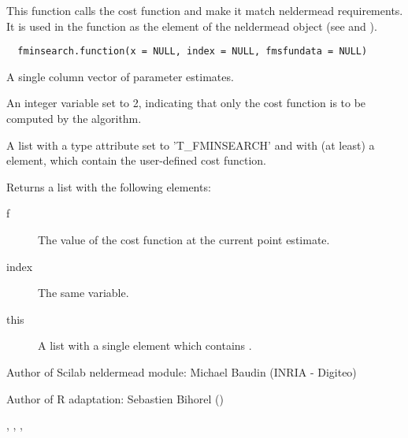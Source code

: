 %
\begin{Description}\relax
This function calls the cost function and make it match neldermead
requirements. It is used in the  function as the
 element of the neldermead object (see 
and ). 
\end{Description}
%
\begin{Usage}
\begin{verbatim}
  fminsearch.function(x = NULL, index = NULL, fmsfundata = NULL)
\end{verbatim}
\end{Usage}
%
\begin{Arguments}
\begin{ldescription}
\item[\code{x}] A single column vector of parameter estimates.
\item[\code{index}] An integer variable set to 2, indicating that only the cost
function is to be computed by the algorithm.
\item[\code{fmsfundata}] A list with a type attribute set to 'T\_FMINSEARCH' and
with (at least) a  element, which contain the user-defined cost
function.
\end{ldescription}
\end{Arguments}
%
\begin{Value}
Returns a list with the following elements: \begin{description}

\item[f] The value of the cost function at the current point estimate.
\item[index] The same  variable.
\item[this] A list with a single element  which
contains .

\end{description}

\end{Value}
%
\begin{Author}\relax
Author of Scilab neldermead module: Michael Baudin (INRIA - Digiteo)

Author of R adaptation: Sebastien Bihorel ()
\end{Author}
%
\begin{SeeAlso}\relax
{},
,
,
\end{SeeAlso}
